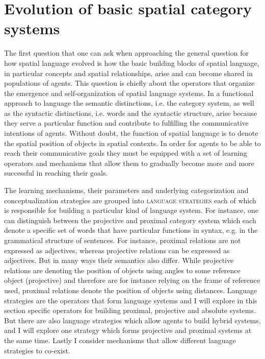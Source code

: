 %


\chapter{Evolution of basic spatial category systems}
\label{s:lexical-systems}
The first question that one can ask when approaching the general question for
how spatial language evolved is how the basic building blocks of
spatial language, in particular concepts and spatial relationships, arise
and can become shared in populations of agents. This question is chiefly
about the operators that organize the emergence and self-organization of 
spatial language systems. In a functional approach to language the semantic distinctions, 
i.e. the category system, as well as the syntactic distinctions, i.e. words 
and the syntactic structure, arise because
they serve a particular function and contribute to fulfilling the communicative intentions
of agents. Without doubt, the function of spatial language is to denote the spatial position of 
objects in spatial contexts. In order for agents to be able to reach their
communicative goals they must be equipped with a set of learning operators and
mechanisms that allow them to gradually become more and more successful in
reaching their goals. 

The learning mechanisms, their parameters and underlying categorization 
and conceptualization strategies are grouped into \textsc{language strategies} 
each of which is responsible for building a particular kind of language system. 
For instance, one can distinguish between the projective and proximal category 
system which each denote a specific set of words that have particular functions 
in syntax, e.g. in the grammatical structure of sentences. 
For instance, proximal relations are not expressed as adjectives, 
whereas projective relations can be expressed as adjectives. 
But in many ways their semantics also differ. While projective relations 
are denoting the position of objects using angles to some reference 
object (projective) and therefore are for instance relying on the frame of 
reference used, proximal relations denote the position of objects using distances. Language strategies are the operators
that form language systems and I will explore in this section specific operators for building
proximal, projective and absolute systems. But there are also language strategies 
which allow agents to build hybrid systems, and I will explore one strategy 
which forms projective and proximal systems at the same time. Lastly I consider
mechanisms that allow different language strategies to co-exist.

